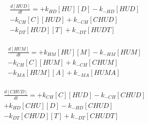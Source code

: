\begin{equation}
\begin{split}
\frac{d[HUD]}{dt} =   + k_{HD}[HU][D]  - k_{-HD}[HUD]     \\%
                      - k_{CH}[C][HUD] + k_{-CH}[CHUD]    \\%
                      - k_{DT}[HUD][T] + k_{-DT}[HUDT]    \\%
\end{split}
\end{equation}

\begin{equation}
\begin{split}
\frac{d[HUM]}{dt} =   + k_{HM}[HU][M]  - k_{-HM}[HUM]     \\%
                      - k_{CH}[C][HUM] + k_{-CH}[CHUM]    \\%
                      - k_{MA}[HUM][A] + k_{-MA}[HUMA]    \\%
\end{split}
\end{equation}

\begin{equation}
\begin{split}
\frac{d[CHUD]}{dt} =  + k_{CH}[C][HUD]  - k_{-CH}[CHUD]   \\%
                      + k_{HD}[CHU][D]  - k_{-HD}[CHUD]   \\%
                      - k_{DT}[CHUD][T] + k_{-DT}[CHUDT]  \\%
\end{split}
\end{equation}

